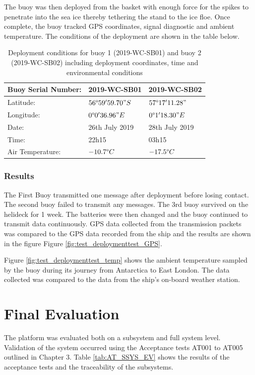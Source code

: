 The buoy was then deployed from the basket with enough force for the spikes to penetrate into the sea ice thereby tethering the stand to the ice floe. Once complete, the buoy tracked GPS coordinates, signal diagnostic and ambient temperature. The conditions of the deployment are shown in the table below.
\begin{table}[H]
    \centering
    \caption{Deployment conditions for buoy 1 (2019-WC-SB01) and buoy 2 (2019-WC-SB02) including deployment coordinates, time and environmental conditions}
    \begin{tabular}{|l|l|l|}
    \hline
    Buoy Serial Number: & 2019-WC-SB01 & 2019-WC-SB02\\
    \hline
    Latitude: & $56\degree 59'59.70" S$ & $57\degree 17'11.28"$\\
    \hline
    Longitude: & $0\degree 0'36.96"E$ & $0\degree 1'18.30"E$\\
    \hline
    Date: & 26th July 2019 & 28th July 2019\\
    \hline
    Time: & 22h15 & 03h15\\
    \hline
    Air Temperature: & $-10.7 \degree C$ & $-17.5 \degree C$\\
    \hline
    \end{tabular}

    \label{tab:test_remotetest_Deployemt }
\end{table}

\subsubsection{Results}
\label{sec:ch4_results}

The First Buoy transmitted one message after deployment before losing contact. The second buoy failed to transmit any messages. The 3rd buoy survived on the helideck for 1 week. The batteries were then changed and the buoy continued to transmit data continuously. GPS data collected from the transmission packets was compared to the GPS data recorded from the ship and the results are shown in the figure Figure \ref{fig:test_deploymenttest_GPS}.


Figure \ref{fig:test_deploymenttest_temp}  shows the ambient temperature sampled by the buoy during its journey from Antarctica to East London. The data collected was compared to the data from the ship's on-board weather station.

\section{Final Evaluation}
\label{sec:ch4_final_eval}
The platform was evaluated both on a subsystem and full system level. Validation of the system occurred using the Acceptance tests AT001 to AT005 outlined in Chapter 3. Table \ref{tab:AT_SSYS_EV} shows the results of the acceptance tests and the traceability of the subsystems.\par

